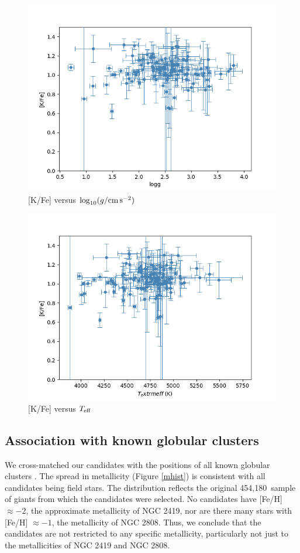 \documentclass[a4paper,fleqn,usenatbib]{mnras}
\newcommand{\LamostGiants}{454,180}
\newcommand{\teff}{T_{\rm eff}}
\newcommand{\logg}{\log_{10}(g/{\rm cm\,s}^{-2})}
\begin{document}
\begin{figure}
	\includegraphics[width=\columnwidth]{Kvslogg.png}
    \caption{[K/Fe] versus $\logg$} 
    \label{Kvslogg}
\end{figure}

\begin{figure}
	\includegraphics[width=\columnwidth]{KvsTeff.png}
    \caption{[K/Fe] versus $\teff$} 
    \label{KvsTeff}
\end{figure}

\subsection{Association with known globular clusters}
\label{sec:globclustasoc}
We cross-matched our candidates with the positions of all known globular clusters \citep{harris1996}. The spread in metallicity (Figure \ref{mhist}) is consistent with all candidates being field stars. The distribution reflects the original \LamostGiants\ sample of giants from which the candidates were selected.
No candidates have [Fe/H] $\approx -2$, the approximate metallicity of NGC 2419, nor are there many stars with [Fe/H] $\approx -1$, the metallicity of NGC 2808. Thus, we conclude that the candidates are not restricted to any specific metallicity, particularly not just to the metallicities of NGC 2419 and NGC 2808.
\end{document}
